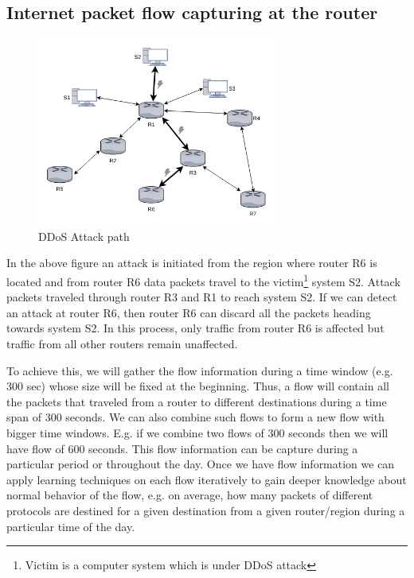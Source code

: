 \documentclass[12pt,oneside,a4paper]{article}
\begin{document}
\subsection{Internet packet flow capturing at the router}

\begin{figure}[H]
\centering
\includegraphics[width=0.70\textwidth]{attack_path.png}
\caption{DDoS Attack path} \label{fig:attackpath}
\end{figure}


In the above figure an attack is initiated from the region where router R6 is located and from router R6 data packets travel to the victim\footnote{Victim is a computer system which is under DDoS attack} system S2. Attack packets traveled through router R3 and R1 to reach system S2. If we can detect an attack at router R6, then router R6 can discard all the packets heading towards system S2. In this process, only traffic from router R6 is affected but traffic from all other routers remain unaffected.

To achieve this, we will gather the flow information during a time window (e.g. 300 sec) whose size will be fixed at the beginning. Thus, a flow will contain all the packets that traveled from a router to different destinations during a time span of 300 seconds. We can also combine such flows to form a new flow with bigger time windows. E.g. if we combine two flows of 300 seconds then we will have flow of 600 seconds. This flow information can be capture during a particular period or throughout the day. Once we have flow information we can apply learning techniques on each flow iteratively to gain deeper knowledge about normal behavior of the flow, e.g. on average, how many packets of different protocols are destined for a given destination from a given router/region during a particular time of the day.
\end{document}
